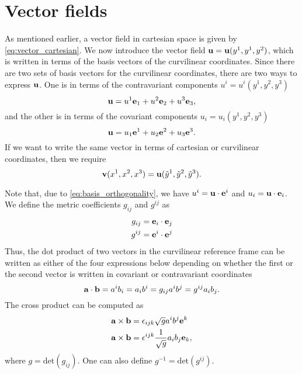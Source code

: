 \documentclass[11pt]{article}
\newcommand{\ytilde}{\tilde{y}}
\begin{document}
\section{Vector fields}
As mentioned earlier, a vector field in cartesian space is given by \cref{eq:vector_cartesian}. We now introduce the vector field $\mathbf{u} = \mathbf{u}(y^1, y^1, y^2)$, which is written in terms of the basis vectors of the curvilinear coordinates. Since there are two sets of basis vectors for the curvilinear coordinates, there are two ways to express $\mathbf{u}$. One is in terms of the contravariant components $u^i = u^i(y^1, y^2, y^3)$
\begin{equation}
    \mathbf{u} = u^1 \mathbf{e}_1 + u^2 \mathbf{e}_2 + u^3 \mathbf{e}_3,
\end{equation}
and the other is in terms of the covariant components $u_i = u_i(y^1, y^2, y^3)$
\begin{equation}
    \mathbf{u} = u_1 \mathbf{e}^1 + u_2 \mathbf{e}^2 + u_3 \mathbf{e}^3.
\end{equation}
If we want to write the same vector in terms of cartesian or curvilinear coordinates, then we require
\begin{equation}
    \vvec(x^1, x^2, x^3) = \uvec(\ytilde^1, \ytilde^2, \ytilde^3).
\end{equation}

Note that, due to \cref{eq:basis_orthogonality}, we have $u^i = \mathbf{u} \cdot \mathbf{e}^i$ and $u_i = \mathbf{u} \cdot \mathbf{e}_i$. We define the metric coefficients $g_{ij}$ and $g^{ij}$ as
\begin{align}
    g_{ij} &= \mathbf{e}_i \cdot \mathbf{e}_j \\
    g^{ij} &= \mathbf{e}^i \cdot \mathbf{e}^j \\
\end{align}
Thus, the dot product of two vectors in the curvilinear reference frame can be written as either of the four expressions below depending on whether the first or the second vector is written in covariant or contravariant coordinates
\begin{equation}
\mathbf{a} \cdot \mathbf{b} = a^i b_i = a_i b^i = g_{ij} a^i b^j = g^{ij} a_i b_j.
\end{equation}
The cross product can be computed as
\begin{align}
    \mathbf{a} \times \mathbf{b} &= \epsilon_{ijk} \sqrt{g} a^i b^j \mathbf{e}^k \\
    \mathbf{a} \times \mathbf{b} &= \epsilon^{ijk} \frac{1}{\sqrt{g}} a_i b_j \mathbf{e}_k,
\end{align}
where $g = \text{det}(g_{ij})$. One can also define $g^{-1} = \text{det}(g^{ij})$.
\end{document}
